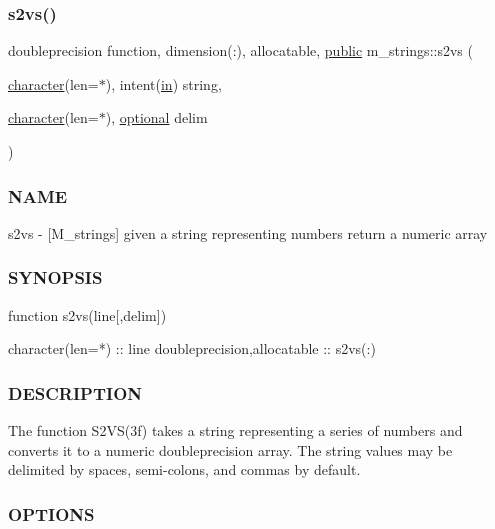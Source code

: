 \subsubsection{\texorpdfstring{s2vs()}{s2vs()}}
{\footnotesize\ttfamily doubleprecision function, dimension(\+:), allocatable, \hyperlink{M__stopwatch_83_8txt_a2f74811300c361e53b430611a7d1769f}{public} m\+\_\+strings\+::s2vs (\begin{DoxyParamCaption}\item[{\hyperlink{option__stopwatch_83_8txt_abd4b21fbbd175834027b5224bfe97e66}{character}(len=$\ast$), intent(\hyperlink{M__journal_83_8txt_afce72651d1eed785a2132bee863b2f38}{in})}]{string,  }\item[{\hyperlink{option__stopwatch_83_8txt_abd4b21fbbd175834027b5224bfe97e66}{character}(len=$\ast$), \hyperlink{option__stopwatch_83_8txt_aa4ece75e7acf58a4843f70fe18c3ade5}{optional}}]{delim }\end{DoxyParamCaption})}



\subsubsection*{N\+A\+ME}

s2vs -\/ \mbox{[}M\+\_\+strings\mbox{]} given a string representing numbers return a numeric array 

\subsubsection*{S\+Y\+N\+O\+P\+S\+IS}

\begin{DoxyVerb}   function s2vs(line[,delim])

    character(len=*) :: line
    doubleprecision,allocatable :: s2vs(:)
\end{DoxyVerb}


\subsubsection*{D\+E\+S\+C\+R\+I\+P\+T\+I\+ON}

\begin{DoxyVerb}The function S2VS(3f) takes a string representing a series of numbers
and converts it to a numeric doubleprecision array. The string values
may be delimited by spaces, semi-colons, and commas by default.
\end{DoxyVerb}


\subsubsection*{O\+P\+T\+I\+O\+NS}

